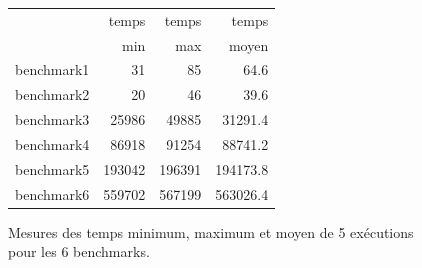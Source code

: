 \documentclass[a4paper, 10pt, french]{article}
\begin{document}
{{    \begin{figure}[ht]
      \begin{center}
        \begin{tabular}{|l|r|r|r||}
          \hline
          \hline
                     & temps     & temps   & temps \\
                 & min       & max     & moyen \\
          \hline
          \hline
            benchmark1  &  31   &  85   &   64.6  \\
          \hline
            benchmark2  &  20   &  46   &  39.6   \\
          \hline
            benchmark3  &  25986  &  49885 & 31291.4    \\
          \hline
            benchmark4  &  86918   & 91254    & 88741.2    \\
          \hline
            benchmark5  &  193042   & 196391    & 194173.8   \\
          \hline
            benchmark6  &  559702   &  567199   & 563026.4    \\
          \hline
          \hline
        \end{tabular}
        \caption{Mesures des temps minimum, maximum et moyen de 5 exécutions pour les 6 benchmarks.}
        \label{table-temps}
      \end{center}
    \end{figure}
}
}
\end{document}
